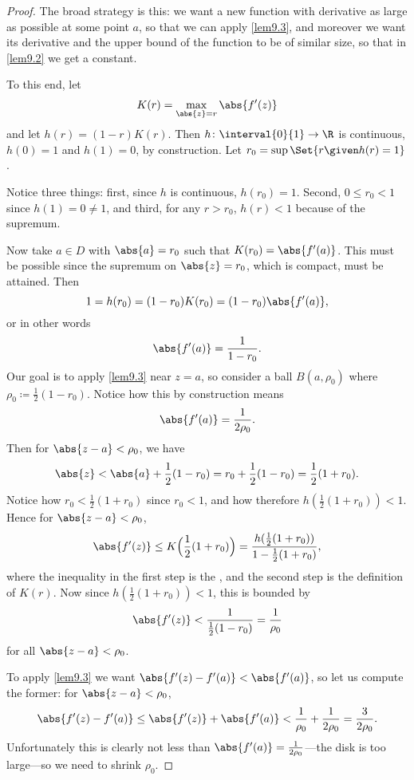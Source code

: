 


\begin{proof}
	The broad strategy is this: we want a new function with derivative as large as possible at some point $a$, so that we can apply \autoref{lem9.3}, and moreover we want its derivative and the upper bound of the function to be of similar size, so that in \autoref{lem9.2} we get a constant.

	To this end, let
	\[
		K(r) = \max_{\abs{z} = r} \abs{f'(z)}
	\]
	and let $h(r) = (1 - r) K(r)$.
	Then $h \colon \interval{0}{1} \to \R$ is continuous, $h(0) = 1$ and $h(1) = 0$, by construction.
	Let $r_0 = \sup\Set{r \given h(r) = 1}$.

	Notice three things: first, since $h$ is continuous, $h(r_0) = 1$.
	Second, $0 \leq r_0 < 1$ since $h(1) = 0 \neq 1$, and third, for any $r > r_0$, $h(r) < 1$ because of the supremum.

	Now take $a \in D$ with $\abs{a} = r_0$ such that $K(r_0) = \abs{f'(a)}$.
	This must be possible since the supremum on $\abs{z} = r_0$, which is compact, must be attained.
	Then
	\[
		1 = h(r_0) = (1 - r_0) K(r_0) = (1 - r_0) \abs{f'(a)},
	\]
	or in other words
	\[
		\abs{f'(a)} = \frac{1}{1 - r_0}.
	\]
	Our goal is to apply \autoref{lem9.3} near $z = a$, so consider a ball $B(a, \rho_0)$ where $\rho_0 \coloneqq \frac{1}{2} (1 - r_0)$.
	Notice how this by construction means
	\begin{equation}\label{lec24:fparho0}
		\abs{f'(a)} = \frac{1}{2 \rho_0}.
	\end{equation}
	Then for $\abs{z - a} < \rho_0$, we have
	\[
		\abs{z} < \abs{a} + \frac{1}{2} (1 - r_0) = r_0 + \frac{1}{2} (1 - r_0) = \frac{1}{2} (1 + r_0).
	\]
	Notice how $r_0 < \frac{1}{2}(1 + r_0)$ since $r_0 < 1$, and how therefore $h(\frac{1}{2} (1 + r_0)) < 1$.
	Hence for $\abs{z - a} < \rho_0$,
	\[
		\abs{f'(z)} \leq K\Bigl( \frac{1}{2}(1 + r_0)\Bigr) = \frac{h(\frac{1}{2} (1 + r_0))}{1 - \frac{1}{2} (1 + r_0)},
	\]
	where the inequality in the first step is the , and the second step is the definition of $K(r)$.
	Now since $h(\frac{1}{2}(1 + r_0)) < 1$, this is bounded by
	\[
		\abs{f'(z)} < \frac{1}{\frac{1}{2} (1 - r_0)} = \frac{1}{\rho_0}
	\]
	for all $\abs{z - a} < \rho_0$.

	To apply \autoref{lem9.3} we want $\abs{f'(z) - f'(a)} < \abs{f'(a)}$, so let us compute the former: for $\abs{z - a} < \rho_0$,
	\[
		\abs{f'(z) - f'(a)} \leq \abs{f'(z)} + \abs{f'(a)} < \frac{1}{\rho_0} + \frac{1}{2 \rho_0} = \frac{3}{2 \rho_0}.
	\]
	Unfortunately this is clearly not less than $\abs{f'(a)} = \frac{1}{2 \rho_0}$---the disk is too large---so we need to shrink $\rho_0$.


\end{proof}
